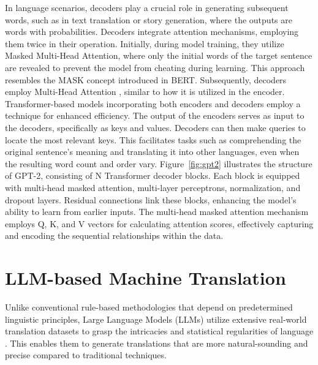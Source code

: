 In language scenarios, decoders play a crucial role in generating subsequent words, such as in text translation or story generation, where the outputs are words with probabilities.
Decoders integrate attention mechanisms, employing them twice in their operation. Initially, during model training, they utilize Masked Multi-Head Attention, where only the initial words of the target sentence are revealed to prevent the model from cheating during learning. This approach resembles the MASK concept introduced in BERT.
Subsequently, decoders employ Multi-Head Attention \cite{liu21}, similar to how it is utilized in the encoder. Transformer-based models incorporating both encoders and decoders employ a technique for enhanced efficiency. The output of the encoders serves as input to the decoders, specifically as keys and values. Decoders can then make queries to locate the most relevant keys. This facilitates tasks such as comprehending the original sentence's meaning and translating it into other languages, even when the resulting word count and order vary.
Figure~\ref{fig:gpt2} illustrates the structure of GPT-2, consisting of N Transformer decoder blocks. Each block is equipped with multi-head masked attention, multi-layer perceptrons, normalization, and dropout layers. Residual connections link these blocks, enhancing the model's ability to learn from earlier inputs. The multi-head masked attention mechanism employs Q, K, and V vectors for calculating attention scores, effectively capturing and encoding the sequential relationships within the data.

\section{LLM-based Machine Translation}
Unlike conventional rule-based methodologies that depend on predetermined linguistic principles, Large Language Models (LLMs) utilize extensive real-world translation datasets to grasp the intricacies and statistical regularities of language \cite{brants07}. This enables them to generate translations that are more natural-sounding and precise compared to traditional techniques.

